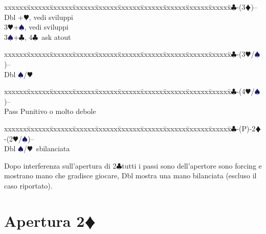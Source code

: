 \documentclass[a4paper,italian]{article}
\newcommand{\BC}{\textcolor{OliveGreen}{$\clubsuit$}}
\newcommand{\BD}{\textcolor{RedOrange}{$\vardiamondsuit$}}
\newcommand{\BH}{\textcolor{Red2}{$\varheartsuit${}}}
\newcommand{\BS}{\textcolor{MidnightBlue}{$\spadesuit${}}}
\newcommand{\pdfd}{\texorpdfstring{\BD{}}{D}}
\newenvironment{bidtable}
{\begin{tabbing}

    xxxxxx\=xxxxxx\=xxxxxx\=xxxxxx\=xxxxxx\=xxxxxx\=xxxxxx\=xxxxxx\=xxxxxx\=xxxxxx\=\kill}
{\end{tabbing} }%
\begin{document}
\begin{multicols}{2}
    \begin{bidtable}
        2\BC-(3\BD)--\+\\
        Dbl +\BH, vedi sviluppi\\
        3\BH {}+\BS, vedi sviluppi\\
        3\BS {}+\BC, 4\BC\ ask atout
    \end{bidtable}
    \begin{bidtable}
        2\BC-(3\BH/\BS)--\+\\
        Dbl \BS/\BH
    \end{bidtable}
    \begin{bidtable}
        2\BC-(4\BH/\BS)--\+\\
        Pass \> Punitivo o molto debole
    \end{bidtable}
    \begin{bidtable}
        2\BC-(P)-2\BD-(2\BH/\BS)--\+\\
        Dbl \BS/\BH\ sbilanciata
    \end{bidtable}

    Dopo interferenza sull'apertura di 2\BC tutti i passi sono dell'apertore sono forcing e mostrano mano
    che gradisce giocare, Dbl mostra una mano bilanciata (escluso il caso riportato).
\end{multicols}

\newpage

\section{Apertura 2\pdfd}
\end{document}
